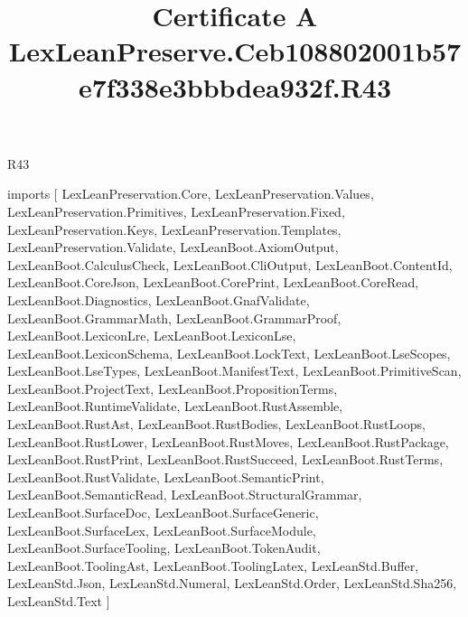 \begin{lexlean}{R43}
\title{Certificate A LexLeanPreserve.Ceb108802001b57e7f338e3bbbdea932f.R43}
\begin{coremodule}
imports [
  LexLeanPreservation.Core,
  LexLeanPreservation.Values,
  LexLeanPreservation.Primitives,
  LexLeanPreservation.Fixed,
  LexLeanPreservation.Keys,
  LexLeanPreservation.Templates,
  LexLeanPreservation.Validate,
  LexLeanBoot.AxiomOutput,
  LexLeanBoot.CalculusCheck,
  LexLeanBoot.CliOutput,
  LexLeanBoot.ContentId,
  LexLeanBoot.CoreJson,
  LexLeanBoot.CorePrint,
  LexLeanBoot.CoreRead,
  LexLeanBoot.Diagnostics,
  LexLeanBoot.GnafValidate,
  LexLeanBoot.GrammarMath,
  LexLeanBoot.GrammarProof,
  LexLeanBoot.LexiconLre,
  LexLeanBoot.LexiconLse,
  LexLeanBoot.LexiconSchema,
  LexLeanBoot.LockText,
  LexLeanBoot.LseScopes,
  LexLeanBoot.LseTypes,
  LexLeanBoot.ManifestText,
  LexLeanBoot.PrimitiveScan,
  LexLeanBoot.ProjectText,
  LexLeanBoot.PropositionTerms,
  LexLeanBoot.RuntimeValidate,
  LexLeanBoot.RustAssemble,
  LexLeanBoot.RustAst,
  LexLeanBoot.RustBodies,
  LexLeanBoot.RustLoops,
  LexLeanBoot.RustLower,
  LexLeanBoot.RustMoves,
  LexLeanBoot.RustPackage,
  LexLeanBoot.RustPrint,
  LexLeanBoot.RustSucceed,
  LexLeanBoot.RustTerms,
  LexLeanBoot.RustValidate,
  LexLeanBoot.SemanticPrint,
  LexLeanBoot.SemanticRead,
  LexLeanBoot.StructuralGrammar,
  LexLeanBoot.SurfaceDoc,
  LexLeanBoot.SurfaceGeneric,
  LexLeanBoot.SurfaceLex,
  LexLeanBoot.SurfaceModule,
  LexLeanBoot.SurfaceTooling,
  LexLeanBoot.TokenAudit,
  LexLeanBoot.ToolingAst,
  LexLeanBoot.ToolingLatex,
  LexLeanStd.Buffer,
  LexLeanStd.Json,
  LexLeanStd.Numeral,
  LexLeanStd.Order,
  LexLeanStd.Sha256,
  LexLeanStd.Text
]


\end{coremodule}
\end{lexlean}
